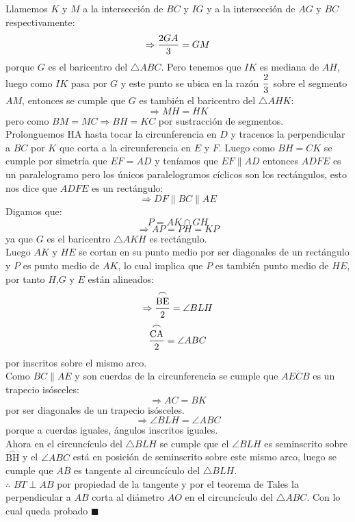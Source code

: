 \documentclass{book}
\begin{document}
\begin{enumerate}
\begin{center}
          \end{center}
          Llamemos $K$ y $M$ a la intersección de $BC$ y $IG$ y a la intersección de $AG$ y $BC$ respectivamente:
          $$\Rightarrow{2GA\over 3}=GM$$
          porque $G$ es el baricentro del $\triangle ABC$. Pero tenemos que $IK$ es mediana de $AH$, luego como $IK$ pasa por $G$ y este punto se ubica en la razón  $\displaystyle{{2\over 3}}$  sobre el segmento $AM$, entonces se cumple que $G$ es también el baricentro del $\triangle AHK$:
          $$\Rightarrow MH=HK$$
          pero como $BM=MC\Rightarrow BH=KC$ por sustracción de segmentos.\\
          Prolonguemos HA hasta tocar la circunferencia en $D$ y tracenos la perpendicular a $BC$ por $K$ que corta a la circunferencia en $E$ y $F$. Luego como $BH=CK$ se cumple por simetría que $EF=AD$ y teníamos que $EF\parallel AD$ entonces $ADFE$ es un paralelogramo pero los únicos paralelogramos cíclicos son los rectángulos, esto nos dice que $ADFE$ es un rectángulo:\\
          $$\Rightarrow DF\parallel BC\parallel AE$$
          Digamos que:
          $$P=AK\cap GH$$
          $$\Rightarrow AP=PH=KP$$
          ya que $G$ es el baricentro $\triangle AKH$ es rectángulo.\\
          Luego $AK$ y $HE$ se cortan en su punto medio por ser diagonales de un rectángulo y $P$ es punto medio de $AK$, lo cual implica que $P$ es también punto medio de $HE$, por tanto $H$,$G$ y $E$ están alineados:
          $$\Rightarrow{\stackrel{\textstyle\frown}{\mathrm{BE}}\over 2}=\angle BLH$$
          $${\stackrel{\textstyle\frown}{\mathrm{CA}}\over 2}=\angle ABC$$
          por inscritos sobre el mismo arco.\\
          Como $BC\parallel AE$ y son cuerdas de la circunferencia se cumple que $AECB$ es un trapecio isósceles:
          $$\Rightarrow AC=BK$$
          por ser diagonales de un trapecio isósceles.
          $$\Rightarrow\angle BLH=\angle ABC$$
          porque a cuerdas iguales, ángulos inscritos iguales.\\
          Ahora en el circuncículo del $\triangle BLH$ se cumple que el $\angle BLH$ es seminscrito sobre $\stackrel{\textstyle\frown}{\mathrm{BH}}$ y el $\angle ABC$ está en posición de seminscrito sobre este mismo arco, luego se cumple que $AB$ es tangente al circuncículo del $\triangle BLH$.\\
          $\therefore$ $BT\perp AB$ por propiedad de la tangente y por el teorema de Tales la perpendicular a $AB$ corta al diámetro $AO$ en el circuncículo del $\triangle ABC$. Con lo cual queda probado $\blacksquare$\\

\end{enumerate}
\end{document}
